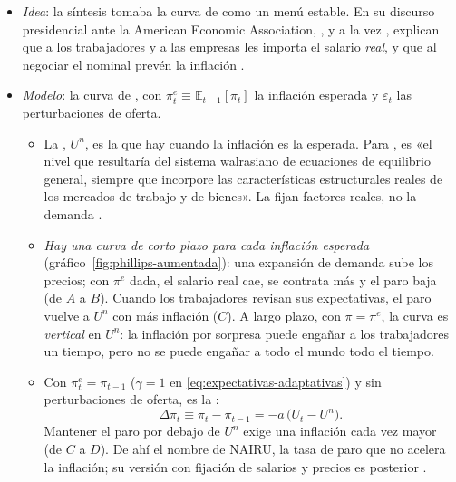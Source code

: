 \documentclass[11pt]{article}
\begin{document}
\begin{itemize}
\item \emph{Idea}: la síntesis tomaba la curva de  como un menú estable. En su discurso presidencial ante la American Economic Association, \textcite{Friedman1968Role}, y a la vez \textcite{Phelps1967Phillips,Phelps1968Money}, explican que a los trabajadores y a las empresas les importa el salario \emph{real}, y que al negociar el nominal prevén la inflación .
\item \emph{Modelo}: la curva de  ,
  con $\pi^e_t\equiv\mathbb{E}_{t-1}[\pi_t]$ la inflación esperada y $\varepsilon_t$ las perturbaciones de oferta.
  \begin{itemize}
  \item La , $U^n$, es la que hay cuando la inflación es la esperada. Para , es «el nivel que resultaría del sistema walrasiano de ecuaciones de equilibrio general, siempre que incorpore las características estructurales reales de los mercados de trabajo y de bienes»\nocite{Friedman1968Role}. La fijan factores reales, no la demanda .
  \item \emph{Hay una curva de corto plazo para cada inflación esperada} (gráfico~\ref{fig:phillips-aumentada}): una expansión de demanda sube los precios; con $\pi^e$ dada, el salario real cae, se contrata más y el paro baja (de $A$ a $B$). Cuando los trabajadores revisan sus expectativas, el paro vuelve a $U^n$ con más inflación ($C$). A largo plazo, con $\pi=\pi^e$, la curva es \emph{vertical} en $U^n$: la inflación por sorpresa puede engañar a los trabajadores un tiempo, pero no se puede engañar a todo el mundo todo el tiempo.
  \item Con $\pi^e_t=\pi_{t-1}$ ($\gamma=1$ en \eqref{eq:expectativas-adaptativas}) y sin perturbaciones de oferta, es la :
    \begin{equation}
    \Delta\pi_t\equiv\pi_t-\pi_{t-1}=-a\,\big(U_t-U^n\big). \label{eq:aceleracionista}
    \end{equation}
    Mantener el paro por debajo de $U^n$ exige una inflación cada vez mayor (de $C$ a $D$). De ahí el nombre de NAIRU, la tasa de paro que no acelera la inflación; su versión con fijación de salarios y precios es posterior .
  \end{itemize}
\end{itemize}
\end{document}
